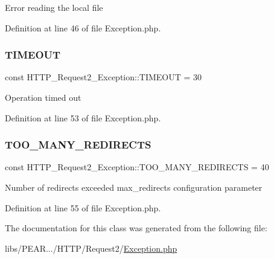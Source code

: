 Error reading the local file 

Definition at line 46 of file Exception.\+php.

\mbox{\label{classHTTP__Request2__Exception_a9eff2e63fc4d2ac0e2692610c7709ac9}} 
\subsubsection{\texorpdfstring{T\+I\+M\+E\+O\+UT}{TIMEOUT}}
{\footnotesize\ttfamily const H\+T\+T\+P\+\_\+\+Request2\+\_\+\+Exception\+::\+T\+I\+M\+E\+O\+UT = 30}

Operation timed out 

Definition at line 53 of file Exception.\+php.

\mbox{\label{classHTTP__Request2__Exception_accfb520aa06566f09fe26138beb3da62}} 
\subsubsection{\texorpdfstring{T\+O\+O\+\_\+\+M\+A\+N\+Y\+\_\+\+R\+E\+D\+I\+R\+E\+C\+TS}{TOO\_MANY\_REDIRECTS}}
{\footnotesize\ttfamily const H\+T\+T\+P\+\_\+\+Request2\+\_\+\+Exception\+::\+T\+O\+O\+\_\+\+M\+A\+N\+Y\+\_\+\+R\+E\+D\+I\+R\+E\+C\+TS = 40}

Number of redirects exceeded \textquotesingle{}max\+\_\+redirects\textquotesingle{} configuration parameter 

Definition at line 55 of file Exception.\+php.



The documentation for this class was generated from the following file\+:\begin{DoxyCompactItemize}
\item 
libs/\+P\+E\+A\+R.../\+H\+T\+T\+P/\+Request2/\hyperlink{HTTP_2Request2_2Exception_8php}{Exception.\+php}\end{DoxyCompactItemize}
